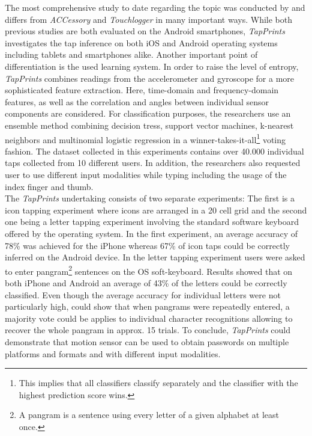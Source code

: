 The most comprehensive study to date regarding the topic was conducted by \citeauthor{Tapprints} and differs from \textit{ACCessory} and \textit{Touchlogger} in many important ways. While both previous studies are both evaluated on the Android smartphones, \textit{TapPrints} investigates the tap inference on both iOS and Android operating systems including tablets and smartphones alike. Another important point of differentiation is the used learning system. In order to raise the level of entropy, \textit{TapPrints} combines readings from the accelerometer and gyroscope for a more sophisticated feature extraction. Here, time-domain and frequency-domain features, as well as the correlation and angles between individual sensor components are considered. For classification purposes, the researchers use an ensemble method combining decision tress, support vector machines, k-nearest neighbors and multinomial logistic regression in a winner-takes-it-all\footnote{This implies that all classifiers classify separately and the classifier with the highest prediction score wins.} voting fashion. The dataset collected in this experiments contains over 40.000 individual taps collected from 10 different users. In addition, the researchers also requested user to use different input modalities while typing including the usage of the index finger and thumb.\\

The \textit{TapPrints} undertaking consists of two separate experiments: The first is a icon tapping experiment where icons are arranged in a 20 cell grid and the second one being a letter tapping experiment involving the standard software keyboard offered by the operating system. In the first experiment, an average accuracy of 78\% was achieved for the iPhone whereas 67\% of icon taps could be correctly inferred on the Android device.
In the letter tapping experiment users were asked to enter pangram\footnote{A pangram is a sentence using every letter of a given alphabet at least once.} sentences on the OS soft-keyboard. Results showed that on both iPhone and Android an average of 43\% of the letters could be correctly classified. Even though the average accuracy for individual letters were not particularly high, \citeauthor{Tapprints} could show that when pangrams were repeatedly entered, a majority vote could be applies to individual character recognitions allowing to recover the whole pangram in approx. 15 trials. To conclude, \textit{TapPrints} could demonstrate that motion sensor can be used to obtain passwords on multiple platforms and formats and with different input modalities.

